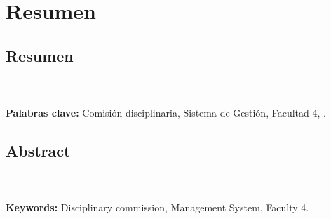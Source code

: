 \chapter*{Resumen}
	\section*{Resumen}
    \lipsum[1]
	\\ \\
	\textbf{Palabras clave: }
	Comisión disciplinaria, Sistema de Gestión, Facultad 4, \uci.


\section*{Abstract}
	\lipsum[1]
	\\ \\
	\textbf{Keywords: }
	Disciplinary commission, Management System, Faculty 4.